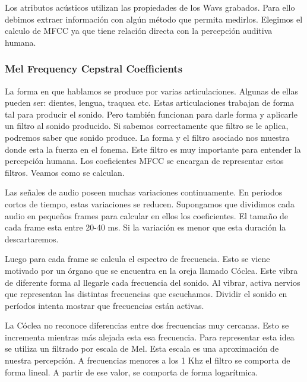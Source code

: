 Los atributos acústicos utilizan las propiedades de los Wavs grabados. Para ello debimos extraer información con algún método que permita medirlos. Elegimos el calculo de MFCC ya que tiene relación directa con la percepción auditiva humana. 

\subsubsection{Mel Frequency Cepstral Coefficients}


La forma en que hablamos se produce por varias articulaciones. Algunas de ellas pueden ser: dientes, lengua, traquea etc. Estas articulaciones trabajan de forma tal para producir el sonido. Pero también funcionan para darle forma y aplicarle un filtro al sonido producido. Si sabemos correctamente que filtro se le aplica, podremos saber que sonido produce. La forma y el filtro asociado nos muestra donde esta la fuerza en el fonema. Este filtro es muy importante para entender la percepción humana. Los coeficientes MFCC se encargan de representar estos filtros. Veamos como se calculan.

Las señales de audio poseen muchas variaciones continuamente. En periodos cortos de tiempo, estas variaciones se reducen. Supongamos que dividimos cada audio en pequeños frames para calcular en ellos los coeficientes. El tamaño de cada frame esta entre 20-40 ms. Si la variación es menor que esta duración la descartaremos.

Luego para cada frame se calcula el espectro de frecuencia. Esto se viene motivado por un órgano que se encuentra en la oreja llamado Cóclea. Este vibra de diferente forma al llegarle cada frecuencia del sonido. Al vibrar, activa nervios que representan las distintas frecuencias que escuchamos. Dividir el sonido en períodos intenta mostrar que frecuencias están activas.

La Cóclea no reconoce diferencias entre dos frecuencias muy cercanas. Esto se incrementa mientras más alejada esta esa frecuencia. Para representar esta idea se utiliza un filtrado por escala de Mel. Esta escala es una aproximación de nuestra percepción. A frecuencias menores a los 1 Khz el filtro se comporta de forma lineal. A partir de ese valor, se comporta de forma logarítmica. 


